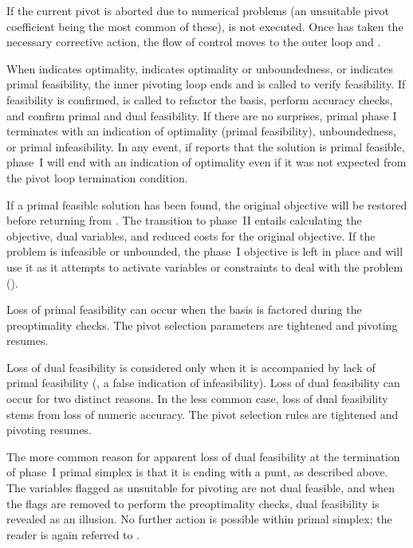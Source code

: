 If the current pivot is aborted due to numerical problems
(an unsuitable pivot coefficient being the most common of these),
 is not executed.
Once  has taken the necessary corrective action, the flow
of control moves to the outer loop and .

When  indicates optimality,
 indicates optimality or unboundedness, or 
 indicates primal feasibility,
the inner pivoting loop ends and
 is called to verify feasibility.
If feasibility is confirmed,  is called to
refactor the basis, perform accuracy checks, and confirm primal and dual
feasibility.
If there are no surprises, primal phase I terminates with an indication of
optimality (primal feasibility), unboundedness, or primal infeasibility.
In any event, if  reports that the
solution is primal
feasible, phase~I will end with an indication of optimality even if it was
not expected from the pivot loop termination condition.

If a primal feasible solution has been found, the original objective will
be restored before returning from .
The transition to phase~II entails calculating the objective, dual variables,
and reduced costs for the original objective.
If the problem is infeasible or unbounded, the phase~I objective is left
in place and \dylp will use it as it attempts to activate variables or
constraints to deal with the problem ().

Loss of primal feasibility can occur when the basis is factored during the
preoptimality checks.
The pivot selection parameters are tightened and pivoting resumes.

Loss of dual feasibility is considered only when it is accompanied
by lack of primal feasibility (\ie, a false indication of infeasibility).
Loss of dual feasibility can occur for two distinct reasons.
In the less common case, loss of dual feasibility stems from loss of numeric
accuracy.
The pivot selection rules are tightened and pivoting resumes.

The more common reason for apparent loss of dual feasibility at the termination
of phase~I primal simplex is that it is ending with a punt, as described
above.
The variables flagged as unsuitable for pivoting are not dual feasible, and
when the flags are removed to perform the preoptimality checks, dual
feasibility is revealed as an illusion.
No further action is possible within primal simplex; the reader is again
referred to .

